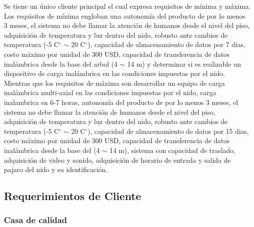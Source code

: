 


Se tiene un único cliente principal el cual expresa requisitos de mínima y máxima. Los requisitos de mínima engloban una autonomía del producto de por lo menos 3 meses, el sistema no debe llamar la atención de humanos desde el nivel del piso, adquisición de temperatura y luz dentro del nido, robusto ante cambios de temperatura (-5 C$^{\circ}$ $\sim$ 20 C$^{\circ}$), capacidad de almacenamiento de datos por 7 dias, costo máximo por unidad de 300 USD, capacidad de transferencia de datos inalámbrica desde la base del arbol (4 $\sim$ 14 m) y determinar si es realizable un dispositivo de carga inalámbrica en las condiciones impuestas por el nido. Mientras que los requisitos de máxima son 
desarrollar un equipo de carga inalámbrica multi-axial en las condiciones impuestas por el nido, carga inalambrica en 6-7 horas, autonomía del producto de por lo menos 3 meses, el sistema no debe llamar la atención de humanos desde el nivel del piso, adquisición de temperatura y luz dentro del nido, robusto ante cambios de temperatura (-5 C$^{\circ}$ $\sim$ 20 C$^{\circ}$), capacidad de almacenamiento de datos por 15 dias, costo máximo por unidad de 300 USD, capacidad de transferencia de datos inalámbrica desde la base del   (4 $\sim$ 14 m), sistema con capacidad de traslado, adquisición de video y sonido, adquisición de horario de entrada y salida de pajaro del nido y su identificación.
 

\subsection{Requerimientos de Cliente}
\subsubsection{Casa de calidad}

